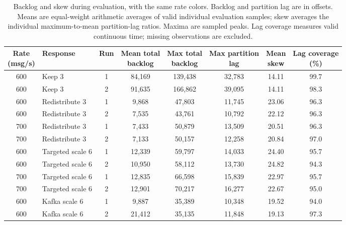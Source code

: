 \clearpage
\begin{table}[!htbp]
\centering\small
\setlength{\tabcolsep}{3pt}
\renewcommand{\arraystretch}{1.12}
\begin{tabular}{@{}clcccccc@{}}
\toprule
\rowcolor[HTML]{DDE3EA}
\shortstack{Rate\\(msg/s)} & Response & Run & \shortstack{Mean total\\backlog} & \shortstack{Max total\\backlog} & \shortstack{Max partition\\lag} & \shortstack{Mean\\skew} & \shortstack{Lag coverage\\(\%)}\\
\midrule
\rowcolor[HTML]{FFE1AD}
600 & Keep 3 & 1 & 84,169 & 139,438 & 32,783 & 14.11 & 99.7\\
\rowcolor[HTML]{FFE1AD}
600 & Keep 3 & 2 & 91,635 & 166,862 & 39,095 & 14.11 & 98.3\\
\rowcolor[HTML]{FFE1AD}
600 & Redistribute 3 & 1 & 9,868 & 47,803 & 11,745 & 23.06 & 96.3\\
\rowcolor[HTML]{FFE1AD}
600 & Redistribute 3 & 2 & 7,535 & 43,761 & 10,792 & 22.12 & 96.3\\
\rowcolor[HTML]{CFE2F3}
700 & Redistribute 3 & 1 & 7,433 & 50,879 & 13,509 & 20.51 & 96.3\\
\rowcolor[HTML]{CFE2F3}
700 & Redistribute 3 & 2 & 7,133 & 50,157 & 12,258 & 20.84 & 97.0\\
\rowcolor[HTML]{FFE1AD}
600 & Targeted scale 6 & 1 & 12,339 & 59,797 & 14,033 & 24.40 & 95.7\\
\rowcolor[HTML]{FFE1AD}
600 & Targeted scale 6 & 2 & 10,950 & 58,112 & 13,730 & 24.82 & 94.3\\
\rowcolor[HTML]{CFE2F3}
700 & Targeted scale 6 & 1 & 12,835 & 66,598 & 15,839 & 22.97 & 95.7\\
\rowcolor[HTML]{CFE2F3}
700 & Targeted scale 6 & 2 & 12,901 & 70,217 & 16,277 & 22.67 & 95.0\\
\rowcolor[HTML]{FFE1AD}
600 & Kafka scale 6 & 1 & 9,887 & 35,389 & 10,348 & 19.52 & 94.0\\
\rowcolor[HTML]{FFE1AD}
600 & Kafka scale 6 & 2 & 21,412 & 35,135 & 11,848 & 19.13 & 97.3\\
\bottomrule
\end{tabular}
\caption{Backlog and skew during evaluation, with the same rate colors. Backlog and partition lag are in offsets. Means are equal-weight arithmetic averages of valid individual evaluation samples; skew averages the individual maximum-to-mean partition-lag ratios. Maxima are sampled peaks. Lag coverage measures valid continuous time; missing observations are excluded.}
\label{tab:four-partition-diagnostics}
\end{table}


